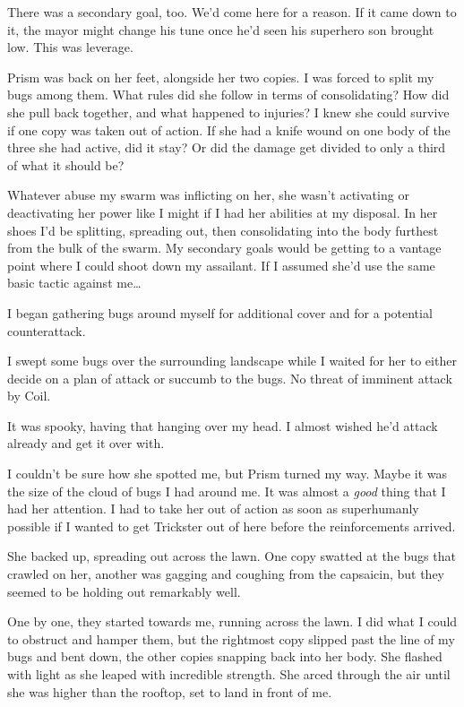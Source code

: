There was a secondary goal, too.  We'd come here for a reason.  If it came down to it, the mayor might change his tune once he'd seen his superhero son brought low.  This was leverage.



Prism was back on her feet, alongside her two copies.  I was forced to split my bugs among them.  What rules did she follow in terms of consolidating?  How did she pull back together, and what happened to injuries?  I knew she could survive if one copy was taken out of action.  If she had a knife wound on one body of the three she had active, did it stay? Or did the damage get divided to only a third of what it should be?



Whatever abuse my swarm was inflicting on her, she wasn't activating or deactivating her power like I might if I had her abilities at my disposal.  In her shoes I'd be splitting, spreading out, then consolidating into the body furthest from the bulk of the swarm.  My secondary goals would be getting to a vantage point where I could shoot down my assailant.  If I assumed she'd use the same basic tactic against me\ldots



I began gathering bugs around myself for additional cover and for a potential counterattack.



I swept some bugs over the surrounding landscape while I waited for her to either decide on a plan of attack or succumb to the bugs.  No threat of imminent attack by Coil.



It was spooky, having that hanging over my head.  I almost wished he'd attack already and get it over with.



I couldn't be sure how she spotted me, but Prism turned my way.  Maybe it was the size of the cloud of bugs I had around me.  It was almost a \emph{good} thing that I had her attention.  I had to take her out of action as soon as superhumanly possible if I wanted to get Trickster out of here before the reinforcements arrived.



She backed up, spreading out across the lawn.  One copy swatted at the bugs that crawled on her, another was gagging and coughing from the capsaicin, but they seemed to be holding out remarkably well.



One by one, they started towards me, running across the lawn.  I did what I could to obstruct and hamper them, but the rightmost copy slipped past the line of my bugs and bent down, the other copies snapping back into her body.  She flashed with light as she leaped with incredible strength.  She arced through the air until she was higher than the rooftop, set to land in front of me.



